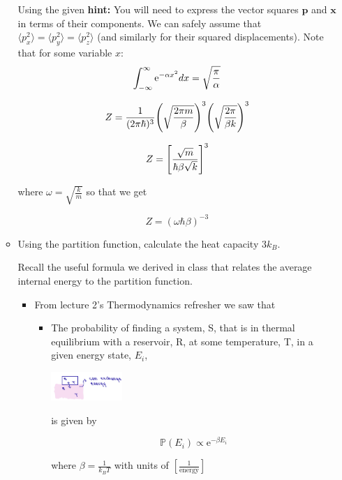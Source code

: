 \begin{enumerate}[label=(\alph*)]
\begin{itemize}
        Using the given \textbf{hint:} You will need to express the vector squares $\mathbf{p}$ and $\mathbf{x}$ in terms of their components. We can safely assume that $\langle p_x^2 \rangle = \langle p_y^2 \rangle = \langle p_z^2 \rangle$ (and similarly for their squared displacements). Note that for some variable $x$:
        \[
        \int_{-\infty}^{\infty} \e^{-\alpha x^2} dx = \sqrt{\frac{\pi}{\alpha}}
        \]

        
        \[ Z = \recip{(2\pi \hbar)^3} \paren*{\sqrt{\frac{2 \pi m}{\beta}}}^3 \paren*{\sqrt{\frac{2 \pi}{\beta k }}}^3\]

        \[ Z = \brackets*{\frac{\sqrt{m}}{\hbar \beta \sqrt{k}}}^3\]

        where $\omega = \sqrt{\frac{k}{m}}$ so that we get

        \[ \boxed{Z = (\omega \hbar \beta)^{-3}}\]

        \item Using the partition function, calculate the heat capacity $3k_B$.

        \divider
        
        Recall the useful formula we derived in class that relates the average internal energy to the partition function.

        \begin{itemize}
            \item From lecture 2's Thermodynamics refresher we saw that

        \begin{itemize}
            \item The probability of finding a system, S, that is in thermal equilibrium with a reservoir, R, at some temperature, T, in a given energy state, $E_i$, 
            \begin{center}
            \includegraphics[width = 0.25\textwidth]{Images/Lecture2-thermo.png}
            \end{center}
            
            is given by 
    
            \[
            \mathbb{P}(E_i) \propto \mathrm{e}^{-\beta E_i}
            \]
    
            where $\beta = \frac{1}{k_B T}$ with units of $\left[ \frac{1}{\text{energy}}\right]$
    

\end{itemize}
\end{itemize}
\end{itemize}
\end{enumerate}
